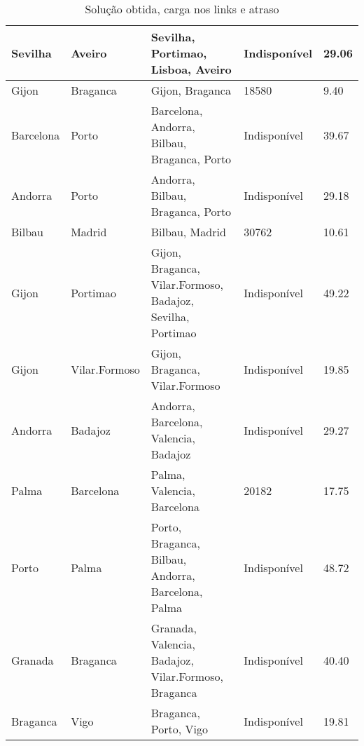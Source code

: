 \begin{table}[!htb]
{\begin{tabular}{|l|l|l|l|l|}
Sevilha & Aveiro & Sevilha, Portimao, Lisboa, Aveiro & Indisponível & 29.06 \\ \hline
Gijon & Braganca & Gijon, Braganca & 18580 & 9.40 \\ \hline
Barcelona & Porto & Barcelona, Andorra, Bilbau, Braganca, Porto & Indisponível & 39.67 \\ \hline
Andorra & Porto & Andorra, Bilbau, Braganca, Porto & Indisponível & 29.18 \\ \hline
Bilbau & Madrid & Bilbau, Madrid & 30762 & 10.61 \\ \hline
Gijon & Portimao & Gijon, Braganca, Vilar.Formoso, Badajoz, Sevilha, Portimao & Indisponível & 49.22 \\ \hline
Gijon & Vilar.Formoso & Gijon, Braganca, Vilar.Formoso & Indisponível & 19.85 \\ \hline
Andorra & Badajoz & Andorra, Barcelona, Valencia, Badajoz & Indisponível & 29.27 \\ \hline
Palma & Barcelona & Palma, Valencia, Barcelona & 20182 & 17.75 \\ \hline
Porto & Palma & Porto, Braganca, Bilbau, Andorra, Barcelona, Palma & Indisponível & 48.72 \\ \hline
Granada & Braganca & Granada, Valencia, Badajoz, Vilar.Formoso, Braganca & Indisponível & 40.40 \\ \hline
Braganca & Vigo & Braganca, Porto, Vigo & Indisponível & 19.81 \\ \hline
\end{tabular}}
\caption[]{Solução obtida, carga nos links e atraso}
\end{table}

